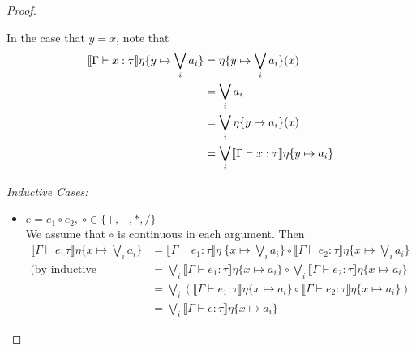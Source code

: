 \begin{proof}
\begin{itemize}
 In the case that $y = x$, note that
  \begin{align*}
  \llbracket \Gamma \vdash x : \tau \rrbracket\eta\{y\mapsto\bigvee_i a_i\} &= \eta\{y\mapsto \bigvee_i a_i\}(x) \\
  &= \bigvee_i a_i \\
  &=\bigvee_i \eta\{y \mapsto a_i\}(x)  \\
  &= \bigvee_i\llbracket{{\Gamma}\vdash{x}:{\tau}}\rrbracket{\eta\{{y}\mapsto{a_i}\}}
  \end{align*}
 \end{itemize}
 \emph{Inductive Cases: }
 \begin{itemize}
 \item $e = e_1 \circ e_2, \ \circ \in \{+, -, *, / \}$ \\
 We assume that $\circ$ is continuous in each argument. Then 
 \begin{align*}
 \llbracket \Gamma \vdash e : \tau \rrbracket\eta\{x \mapsto \bigvee_i a_i\} &= \llbracket \Gamma\vdash e_1 : \tau 
 \rrbracket\eta\ \{x \mapsto \bigvee_i a_i\} \circ \llbracket \Gamma \vdash e_2 : \tau \rrbracket\eta\{x \mapsto \bigvee_i a_i\}\\
  \text{(by inductive hypothesis)} &=  \bigvee_i\llbracket \Gamma \vdash e_1: \tau \rrbracket\eta\{x\mapsto a_i\} \circ
  \bigvee_i\llbracket \Gamma \vdash e_2: \tau \rrbracket\eta\{x\mapsto a_i\}  \\
  &= \bigvee_i(\llbracket \Gamma \vdash e_1: \tau \rrbracket\eta\{x\mapsto a_i\} \circ 
  \llbracket \Gamma \vdash e_2: \tau \rrbracket\eta\{x\mapsto a_i\}) \\
  &= \bigvee_i \llbracket \Gamma \vdash e: \tau \rrbracket\eta\{x\mapsto a_i\}
 \end{align*}


\end{itemize}
\end{proof}
